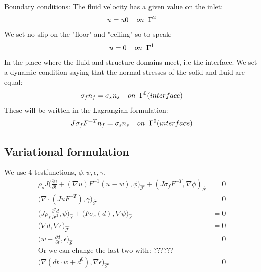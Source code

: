 Boundary conditions:
The fluid velocity has a given value on the inlet:
$$ u = u0 \hspace{4mm}on \hspace{2mm} \Gamma^2$$
We set no slip on the "floor" and "ceiling" so to speak:
$$ u = 0  \hspace{4mm}on \hspace{2mm} \Gamma^1  $$
In the place where the fluid and structure domains meet, i.e the interface. We set a dynamic condition saying that the normal stresses of the solid and fluid are equal:
$$  \sigma_f n_f = \sigma_s n_s \hspace{4mm} on  \hspace{2mm}\Gamma^0 (interface)   $$
These will be written in the Lagrangian formulation:
$$  J\sigma_f F^{-T} n_f = \sigma_s  n_s \hspace{4mm} on  \hspace{2mm}\Gamma^0 (interface)   $$
\subsection*{Variational formulation}
We use 4 testfunctions, $\phi, \psi, \epsilon, \gamma$.
\begin{align*}
\rho_s J \big( \frac{\partial u}{\partial t} + (\nabla u)F^{-1}(u-w) , \phi\big)_{\mathcal{\hat{F}}} + (J\sigma_f F^{-T},\nabla \phi )_{\mathcal{\hat{F}}} &= 0  \\
 \big( \nabla \cdot (J u F^{-T}),\gamma \big)_{\mathcal{\hat{F}}} &= 0 \\
\big(J\rho_s \frac{\partial^2 d}{\partial t^2},\psi \big)_{\mathcal{\hat{S}}} + \big(F \sigma_s(d), \nabla \psi \big)_{\mathcal{\hat{S}}} &=0 \\
 \big( \nabla d , \nabla \epsilon \big)_{\mathcal{\hat{F}}} &= 0 \\
 \big( w- \frac{\partial d}{\partial t} ,\epsilon \big)_{\mathcal{\hat{S}}} &= 0 \\
 \text{Or we can change the last two with:  ??????} & \\ 
 \big( \nabla (dt\cdot w + d^0) , \nabla \epsilon \big)_{\mathcal{\hat{F}}} &= 0 
\end{align*}



